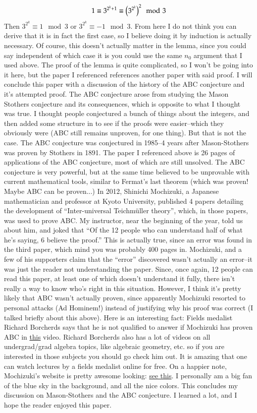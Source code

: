 \documentclass[12pt]{article}
\theoremstyle{definitionstyle}
\begin{document}
\begin{align*}
	1 \equiv 3^{2^k+1} \equiv \qty(3^{2^k})^2 \mod 3
\end{align*}
Then $3^{2^k} \equiv 1 \mod 3$ or $3^{2^k} \equiv -1 \mod 3$. From here I do not think you can derive that it is in fact the first case, so I believe doing it by induction is actually necessary. Of course, this doesn't actually matter in the lemma, since you could say independent of which case it is you could use the same $n_0$ argument that I used above. The proof of the lemma is quite complicated, so I won't be going into it here, but the paper I referenced references another paper with said proof. I will conclude this paper with a discussion of the history of the ABC conjecture and it's attempted proof. The ABC conjecture arose from studying the Mason Stothers conjecture and its consequences, which is opposite to what I thought was true. I thought people conjectured a bunch of things about the integers, and then added some structure in to see if the proofs were easier--which they obviously were (ABC still remains unproven, for one thing). But that is not the case. The ABC conjecture was conjectured in 1985--4 years after Mason-Stothers was proven by Stothers in 1891. The paper I referenced above is 26 pages of applications of the ABC conjecture, most of which are still unsolved. The ABC conjecture is very powerful, but at the same time believed to be unprovable with current mathematical tools, similar to Fermat's last theorem (which was proven! Maybe ABC can be proven...) In 2012, Shinichi Mochizuki, a Japanese mathematician and professor at Kyoto University, published 4 papers detailing the development of ``Inter-universal Teichmüller theory'', which, in those papers, was used to prove ABC. My instructor, near the beginning of the year, told us about him, and joked that ``Of the 12 people who can understand half of what he's saying, 6 believe the proof.'' This is actually true, since an error was found in the third paper, which mind you was probably 400 pages in. Mochizuki, and a few of his supporters claim that the ``error'' discovered wasn't actually an error--it was just the reader not understanding the paper. Since, once again, 12 people can read this paper, at least one of which doesn't understand it fully, there isn't really a way to know who's right in this situation. However, I think it's pretty likely that ABC wasn't actually proven, since apparently Mochizuki resorted to personal attacks (Ad Hominem!) instead of justifying why his proof was correct (I talked briefly about this above). Here is an interesting fact: Fields medalist Richard Borcherds says that he is not qualified to answer if Mochizuki has proven ABC in \href{https://www.youtube.com/watch?v=Xu6Wo_pvzts}{this} video. Richard Borcherds also has a lot of videos on all undergrad/grad algebra topics, like algebraic geometry, etc. so if you are interested in those subjects you should go check him out. It is amazing that one can watch lectures by a fields medalist online for free. On a happier note, Mochizuki's website is pretty awesome looking: \href{https://www.kurims.kyoto-u.ac.jp/~motizuki/top-english.html}{see this}. I personally am a big fan of the blue sky in the background, and all the nice colors. This concludes my discussion on Mason-Stothers and the ABC conjecture. I learned a lot, and I hope the reader enjoyed this paper.


\end{document}
